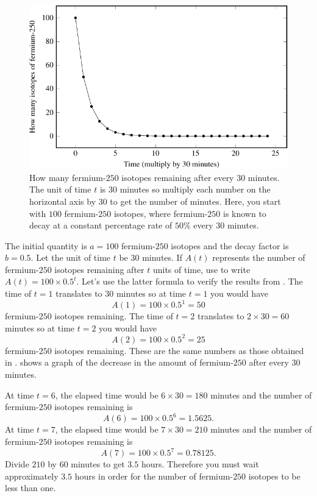 \documentclass[a4paper,oneside,12pt]{article}
\begin{document}
{\begin{solution}
\begin{figure}[!htbp]
\centering
\includegraphics[scale=1.1]{image/11/fermium250.pdf}
\caption{%
  How many fermium-$250$ isotopes remaining after every $30$ minutes.
  The unit of time $t$ is $30$ minutes so multiply each number on the
  horizontal axis by $30$ to get the number of minutes.  Here, you
  start with $100$ fermium-$250$ isotopes, where fermium-$250$ is
  known to decay at a constant percentage rate of $50\%$ every $30$
  minutes.
}
\label{fig:exponential:fermium250_decay}
\end{figure}

The initial quantity is $a = 100$ fermium-$250$ isotopes and the decay
factor is $b = 0.5$.  Let the unit of time $t$ be $30$ minutes.  If
$A(t)$ represents the number of fermium-$250$ isotopes remaining after
$t$ units of time, use  to
write $A(t) = 100 \times 0.5^t$.  Let's use the latter formula to
verify the results
from .  The
time of $t = 1$ translates to $30$ minutes so at time $t = 1$ you
would have
\[
A(1)
=
100 \times 0.5^1
=
50
\]
fermium-$250$ isotopes remaining.  The time of $t = 2$ translates to
$2 \times 30 = 60$ minutes so at time $t = 2$ you would have
\[
A(2)
=
100 \times 0.5^2
=
25
\]
fermium-$250$ isotopes remaining.  These are the same numbers as those
obtained in .
 shows a graph of the
decrease in the amount of fermium-$250$ after every $30$ minutes.

At time $t = 6$, the elapsed time would be $6 \times 30 = 180$ minutes
and the number of fermium-$250$ isotopes remaining is
\[
A(6)
=
100 \times 0.5^6
=
1.5625.
\]
At time $t = 7$, the elapsed time would be $7 \times 30 = 210$ minutes
and the number of fermium-$250$ isotopes remaining is
\[
A(7)
=
100 \times 0.5^7
=
0.78125.
\]
Divide $210$ by $60$ minutes to get $3.5$ hours.  Therefore you must
wait approximately $3.5$ hours in order for the number of
fermium-$250$ isotopes to be less than one.
\end{solution}
}{}
\end{document}
